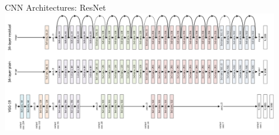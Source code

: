 \begin{frame}{CNN Architectures: ResNet}
	\centering
	\includegraphics[width=0.9\textwidth]{../Images/CNNArchitectures/ResNet.png}\\
\end{frame}

